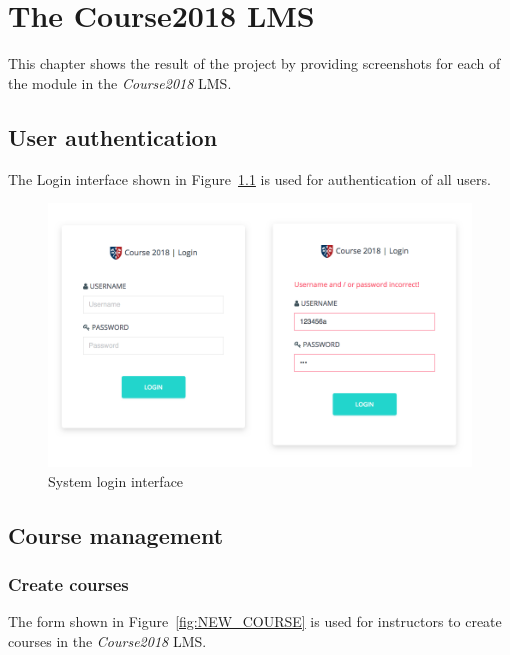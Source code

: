 

\chapter{The Course2018 LMS}
\label{chap:RSLT}

This chapter shows the result of the project by providing screenshots for
each of the module in the \emph{Course2018} LMS.

\section{User authentication}
The Login interface shown in Figure~\ref{fig:LOGIN} is used for authentication
of all users.
\begin{figure}[ht]
    \centering
        \includegraphics[width=.8\textwidth]{figures/login}
    \caption{System login interface}
    \label{fig:LOGIN}
\end{figure}

\section{Course management}

\subsection{Create courses}
The form shown in Figure~\ref{fig:NEW_COURSE} is used for instructors to create
courses in the \emph{Course2018} LMS.

